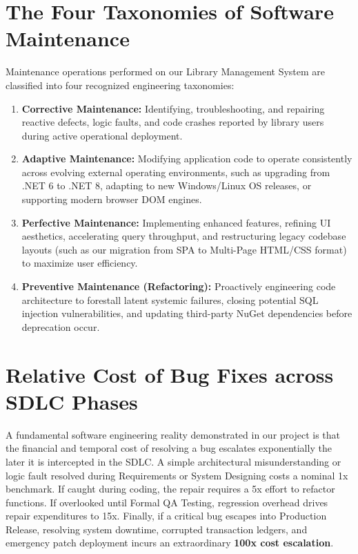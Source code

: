 \documentclass[11pt,a4paper]{report}
\begin{document}
\section{The Four Taxonomies of Software Maintenance}
Maintenance operations performed on our Library Management System are classified into four recognized engineering taxonomies:
\begin{enumerate}[leftmargin=1.5em]
    \item \textbf{Corrective Maintenance:} Identifying, troubleshooting, and repairing reactive defects, logic faults, and code crashes reported by library users during active operational deployment.
    \item \textbf{Adaptive Maintenance:} Modifying application code to operate consistently across evolving external operating environments, such as upgrading from .NET 6 to .NET 8, adapting to new Windows/Linux OS releases, or supporting modern browser DOM engines.
    \item \textbf{Perfective Maintenance:} Implementing enhanced features, refining UI aesthetics, accelerating query throughput, and restructuring legacy codebase layouts (such as our migration from SPA to Multi-Page HTML/CSS format) to maximize user efficiency.
    \item \textbf{Preventive Maintenance (Refactoring):} Proactively engineering code architecture to forestall latent systemic failures, closing potential SQL injection vulnerabilities, and updating third-party NuGet dependencies before deprecation occur.
\end{enumerate}

\section{Relative Cost of Bug Fixes across SDLC Phases}
A fundamental software engineering reality demonstrated in our project is that the financial and temporal cost of resolving a bug escalates exponentially the later it is intercepted in the SDLC. A simple architectural misunderstanding or logic fault resolved during Requirements or System Designing costs a nominal 1x benchmark. If caught during coding, the repair requires a 5x effort to refactor functions. If overlooked until Formal QA Testing, regression overhead drives repair expenditures to 15x. Finally, if a critical bug escapes into Production Release, resolving system downtime, corrupted transaction ledgers, and emergency patch deployment incurs an extraordinary \textbf{100x cost escalation}.
\end{document}
